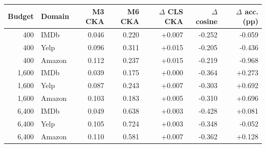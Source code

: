 \begin{tabular}{rlrrrrr}\toprule
Budget & Domain & M3 CKA & M6 CKA & $\Delta$ CLS CKA & $\Delta$ cosine & $\Delta$ acc. (pp)\\\midrule
400 & IMDb & 0.046 & 0.220 & +0.007 & -0.252 & -0.059\\
400 & Yelp & 0.096 & 0.311 & +0.015 & -0.205 & -0.436\\
400 & Amazon & 0.112 & 0.237 & +0.015 & -0.219 & -0.968\\
1,600 & IMDb & 0.039 & 0.175 & +0.000 & -0.364 & +0.273\\
1,600 & Yelp & 0.087 & 0.243 & +0.007 & -0.303 & +0.692\\
1,600 & Amazon & 0.103 & 0.183 & +0.005 & -0.310 & +0.696\\
6,400 & IMDb & 0.049 & 0.638 & +0.003 & -0.428 & +0.081\\
6,400 & Yelp & 0.105 & 0.724 & +0.003 & -0.348 & -0.052\\
6,400 & Amazon & 0.110 & 0.581 & +0.007 & -0.362 & +0.128\\
\bottomrule\end{tabular}
